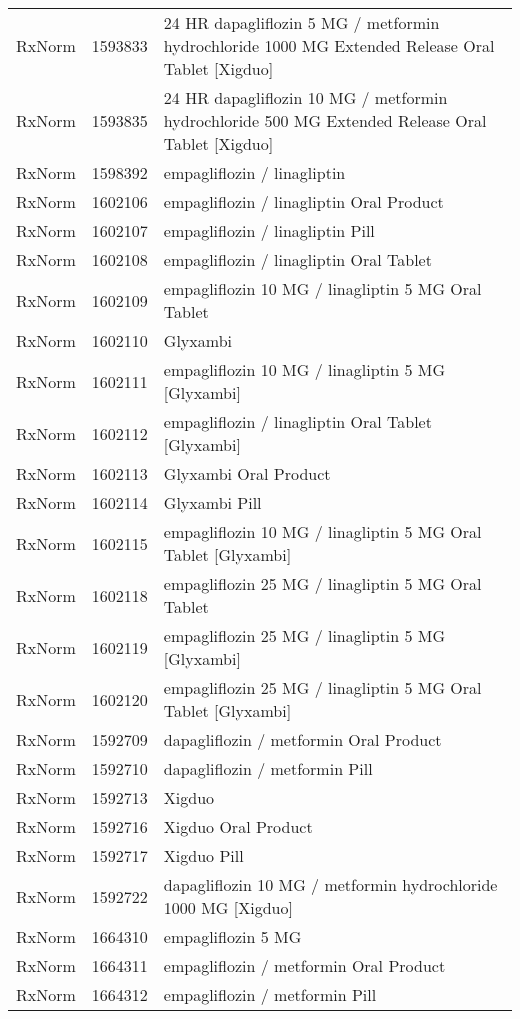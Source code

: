 \begin{longtable}{p{}p{}p{}}
  RxNorm & 1593833 & 24 HR dapagliflozin 5 MG / metformin hydrochloride 1000 MG Extended Release Oral Tablet [Xigduo] \\ 
  RxNorm & 1593835 & 24 HR dapagliflozin 10 MG / metformin hydrochloride 500 MG Extended Release Oral Tablet [Xigduo] \\ 
  RxNorm & 1598392 & empagliflozin / linagliptin \\ 
  RxNorm & 1602106 & empagliflozin / linagliptin Oral Product \\ 
  RxNorm & 1602107 & empagliflozin / linagliptin Pill \\ 
  RxNorm & 1602108 & empagliflozin / linagliptin Oral Tablet \\ 
  RxNorm & 1602109 & empagliflozin 10 MG / linagliptin 5 MG Oral Tablet \\ 
  RxNorm & 1602110 & Glyxambi \\ 
  RxNorm & 1602111 & empagliflozin 10 MG / linagliptin 5 MG [Glyxambi] \\ 
  RxNorm & 1602112 & empagliflozin / linagliptin Oral Tablet [Glyxambi] \\ 
  RxNorm & 1602113 & Glyxambi Oral Product \\ 
  RxNorm & 1602114 & Glyxambi Pill \\ 
  RxNorm & 1602115 & empagliflozin 10 MG / linagliptin 5 MG Oral Tablet [Glyxambi] \\ 
  RxNorm & 1602118 & empagliflozin 25 MG / linagliptin 5 MG Oral Tablet \\ 
  RxNorm & 1602119 & empagliflozin 25 MG / linagliptin 5 MG [Glyxambi] \\ 
  RxNorm & 1602120 & empagliflozin 25 MG / linagliptin 5 MG Oral Tablet [Glyxambi] \\ 
  RxNorm & 1592709 & dapagliflozin / metformin Oral Product \\ 
  RxNorm & 1592710 & dapagliflozin / metformin Pill \\ 
  RxNorm & 1592713 & Xigduo \\ 
  RxNorm & 1592716 & Xigduo Oral Product \\ 
  RxNorm & 1592717 & Xigduo Pill \\ 
  RxNorm & 1592722 & dapagliflozin 10 MG / metformin hydrochloride 1000 MG [Xigduo] \\ 
  RxNorm & 1664310 & empagliflozin 5 MG \\ 
  RxNorm & 1664311 & empagliflozin / metformin Oral Product \\ 
  RxNorm & 1664312 & empagliflozin / metformin Pill \\ 

\end{longtable}
